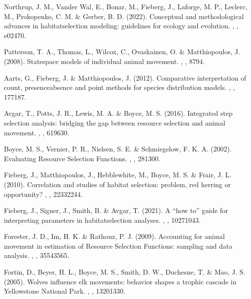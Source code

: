 \documentclass[letterpaper,10pt,english]{sphinxmanual}
\begin{document}
\sphinxAtStartPar
Northrup, J. M., Vander Wal, E., Bonar, M., Fieberg, J., Laforge, M. P., Leclerc, M., Prokopenko, C. M. \& Gerber, B. D. (2022). Conceptual and methodological advances in habitat\sphinxhyphen{}selection modeling: guidelines for ecology and evolution. , , e02470.

\sphinxAtStartPar
Patterson, T. A., Thomas, L., Wilcox, C., Ovaskainen, O. \& Matthiopoulos, J. (2008). State\sphinxhyphen{}space models of individual animal movement. , , 87\textendash{}94.

\sphinxAtStartPar
Aarts, G., Fieberg, J. \& Matthiopoulos, J. (2012). Comparative interpretation of count, presence\textendash{}absence and point methods for species distribution models. , , 177\textendash{}187.

\sphinxAtStartPar
Avgar, T., Potts, J. R., Lewis, M. A. \& Boyce, M. S. (2016). Integrated step selection analysis: bridging the gap between resource selection and animal movement. , , 619\textendash{}630.

\sphinxAtStartPar
Boyce, M. S., Vernier, P. R., Nielsen, S. E. \& Schmiegelow, F. K. A. (2002). Evaluating Resource Selection Functions. , , 281\textendash{}300.

\sphinxAtStartPar
Fieberg, J., Matthiopoulos, J., Hebblewhite, M., Boyce, M. S. \& Frair, J. L. (2010). Correlation and studies of habitat selection: problem, red herring or opportunity? , , 2233\textendash{}2244.

\sphinxAtStartPar
Fieberg, J., Signer, J., Smith, B. \& Avgar, T. (2021). A “how to” guide for interpreting parameters in habitat\sphinxhyphen{}selection analyses. , , 1027\textendash{}1043.

\sphinxAtStartPar
Forester, J. D., Im, H. K. \& Rathouz, P. J. (2009). Accounting for animal movement in estimation of Resource Selection Functions: sampling and data analysis. , , 3554\textendash{}3565.

\sphinxAtStartPar
Fortin, D., Beyer, H. L., Boyce, M. S., Smith, D. W., Duchesne, T. \& Mao, J. S. (2005). Wolves influence elk movements: behavior shapes a trophic cascade in Yellowstone National Park. , , 1320\textendash{}1330.
\end{document}
